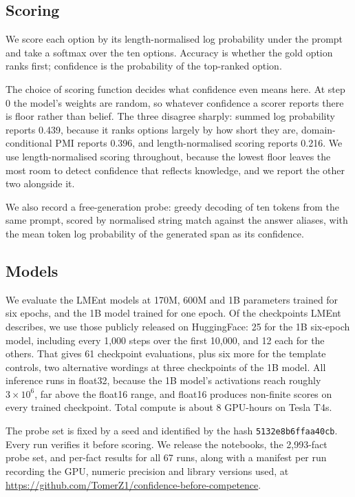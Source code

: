 \documentclass[11pt]{article}
\begin{document}
\subsection{Scoring}
\label{sec:scoring}

We score each option by its length-normalised log probability under the prompt and take a softmax
over the ten options. Accuracy is whether the gold option ranks first; confidence is the
probability of the top-ranked option.

The choice of scoring function decides what confidence even means here. At step 0 the model's weights are
random, so whatever confidence a scorer reports there is floor rather than belief. The three
disagree sharply: summed log probability reports 0.439, because it ranks options largely by how
short they are, domain-conditional PMI \citep{holtzman-etal-2021-surface} reports 0.396, and
length-normalised scoring reports 0.216. We use length-normalised scoring throughout, because the
lowest floor leaves the most room to detect confidence that reflects knowledge, and we report the
other two alongside it.

We also record a free-generation probe: greedy decoding of ten tokens from the same prompt,
scored by normalised string match against the answer aliases, with the mean token log probability
of the generated span as its confidence.

\subsection{Models}

We evaluate the LMEnt models at 170M, 600M and 1B parameters trained for six epochs, and the 1B
model trained for one epoch. Of the checkpoints LMEnt describes, we use those publicly released
on HuggingFace: 25 for the 1B six-epoch model, including every 1{,}000 steps over the first
10{,}000, and 12 each for the others. That gives 61 checkpoint evaluations, plus six more for the
template controls, two alternative wordings at three checkpoints of the 1B model. All inference runs in float32, because the 1B model's activations reach
roughly $3\times10^{6}$, far above the float16 range, and float16 produces non-finite scores on
every trained checkpoint. Total compute is about 8 GPU-hours on Tesla T4s.

The probe set is fixed by a seed and identified by the hash \texttt{5132e8b6ffaa40cb}. Every run
verifies it before scoring. We release the notebooks, the 2{,}993-fact probe set, and per-fact
results for all 67 runs, along with a manifest per run recording the GPU, numeric precision and
library versions used, at \url{https://github.com/TomerZ1/confidence-before-competence}.
\end{document}
